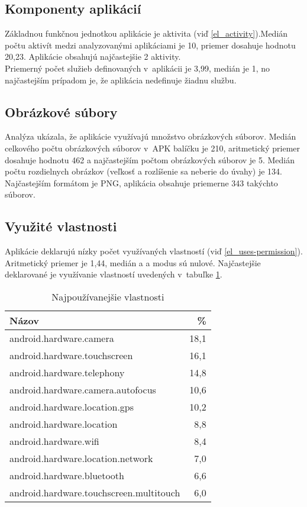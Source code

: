 \subsection*{Komponenty aplikácií}

Základnou funkčnou jednotkou aplikácie je aktivita (viď \ref{el_activity}).Medián počtu aktivít medzi analyzovanými aplikáciami je  10, priemer dosahuje hodnotu 20,23. Aplikácie obsahujú najčastejšie 2 aktivity.\\Priemerný počet služieb definovaných v~aplikácii je 3,99, medián je 1, no najčastejším prípadom je, že aplikácia nedefinuje žiadnu službu.

\subsection*{Obrázkové súbory}
Analýza ukázala, že aplikácie využívajú množstvo obrázkových súborov. Medián celkového počtu obrázkových súborov v~APK balíčku je 210, aritmetický priemer dosahuje hodnotu 462 a najčastejším počtom obrázkových súborov je 5. Medián počtu rozdielnych obrázkov (veľkosť a rozlíšenie sa neberie do úvahy) je 134. Najčastejším formátom je PNG, aplikácia obsahuje priemerne 343 takýchto súborov.


\subsection*{Využité vlastnosti}
Aplikácie deklarujú nízky počet využívaných vlastností (viď \ref{el_uses-permission}). Aritmetický priemer je 1,44, medián a a modus sú nulové. Najčastejšie deklarované je využívanie vlastností uvedených v~tabuľke \ref{tab:features}.
\begin{table}[htb]
\centering
  \begin{tabular}{|l r|}
    \hline
    \textbf{Názov} & \textbf{\%} \\\hline\hline
    android.hardware.camera & 18,1 \\
    android.hardware.touchscreen & 16,1 \\
    android.hardware.telephony & 14,8 \\
    android.hardware.camera.autofocus & 10,6 \\
    android.hardware.location.gps & 10,2 \\
    android.hardware.location & 8,8 \\
    android.hardware.wifi & 8,4 \\
    android.hardware.location.network & 7,0\\
    android.hardware.bluetooth & 6,6\\
    android.hardware.touchscreen.multitouch & 6,0\\
    \hline
  \end{tabular}
  \caption{Najpoužívanejšie vlastnosti}
  \label{tab:features}
\end{table}

